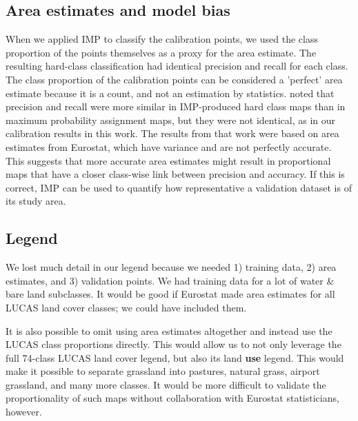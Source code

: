     \subsection{Area estimates and model bias}

        When we applied IMP to classify the calibration points, we used the class proportion of the points themselves as a proxy for the area estimate. The resulting hard-class classification had identical precision and recall for each class. The class proportion of the calibration points can be considered a 'perfect' area estimate because it is a count, and not an estimation by statistics. \citet{witjes2024iterative} noted that precision and recall were more similar in IMP-produced hard class maps than in maximum probability assignment maps, but they were not identical, as in our calibration results in this work. The results from that work were based on area estimates from Eurostat, which have variance and are not perfectly accurate. This suggests that more accurate area estimates might result in proportional maps that have a closer class-wise link between precision and accuracy. If this is correct, IMP can be used to quantify how representative a validation dataset is of its study area.
    
    \subsection{Legend}
        We lost much detail in our legend because we needed 1) training data, 2) area estimates, and 3) validation points. We had training data for a lot of water \& bare land subclasses. It would be good if Eurostat made area estimates for all LUCAS land cover classes; we could have included them.

        It is also possible to omit using area estimates altogether and instead use the LUCAS class proportions directly. This would allow us to not only leverage the full 74-class LUCAS land cover legend, but also its land \textbf{use} legend. This would make it possible to separate grassland into pastures, natural grass, airport grassland, and many more classes. It would be more difficult to validate the proportionality of such maps without collaboration with Eurostat statisticians, however. 

        